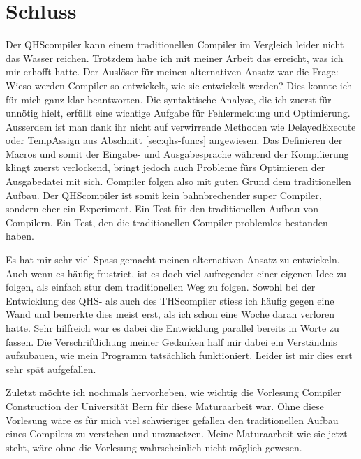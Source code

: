 \chapter{Schluss}
Der QHScompiler kann einem traditionellen Compiler im Vergleich leider nicht das Wasser reichen.
Trotzdem habe ich mit meiner Arbeit das erreicht, was ich mir erhofft hatte. Der Auslöser für meinen alternativen Ansatz war die Frage: Wieso werden Compiler so entwickelt, wie sie entwickelt werden? 
Dies konnte ich für mich ganz klar beantworten. Die syntaktische Analyse, die ich zuerst für unnötig hielt, erfüllt eine wichtige Aufgabe für Fehlermeldung und Optimierung.
Ausserdem ist man dank ihr nicht auf verwirrende Methoden wie DelayedExecute oder TempAssign aus Abschnitt \ref{sec:qhs-funcs} angewiesen.
Das Definieren der Macros und somit der Eingabe- und Ausgabesprache während der Kompilierung klingt zuerst verlockend, bringt jedoch auch Probleme fürs Optimieren der Ausgabedatei mit sich.
Compiler folgen also mit guten Grund dem traditionellen Aufbau.
Der QHScompiler ist somit kein bahnbrechender super Compiler, sondern eher ein Experiment.
Ein Test für den traditionellen Aufbau von Compilern. Ein Test, den die traditionellen Compiler problemlos bestanden haben.

Es hat mir sehr viel Spass gemacht meinen alternativen Ansatz zu entwickeln. Auch wenn es häufig frustriet, ist es doch viel aufregender einer eigenen Idee zu folgen, als einfach stur dem traditionellen Weg zu folgen.
Sowohl bei der Entwicklung des QHS- als auch des THScompiler stiess ich häufig gegen eine Wand und bemerkte dies meist erst, als ich schon eine Woche daran verloren hatte.
Sehr hilfreich war es dabei die Entwicklung parallel bereits in Worte zu fassen. Die Verschriftlichung meiner Gedanken half mir dabei ein Verständnis aufzubauen, wie mein Programm tatsächlich funktioniert.
Leider ist mir dies erst sehr spät aufgefallen.

Zuletzt möchte ich nochmals hervorheben, wie wichtig die Vorlesung Compiler Construction der Universität Bern für diese Maturaarbeit war.
Ohne diese Vorlesung wäre es für mich viel schwieriger gefallen den traditionellen Aufbau eines Compilers zu verstehen und umzusetzen.
Meine Maturaarbeit wie sie jetzt steht, wäre ohne die Vorlesung wahrscheinlich nicht möglich gewesen.




